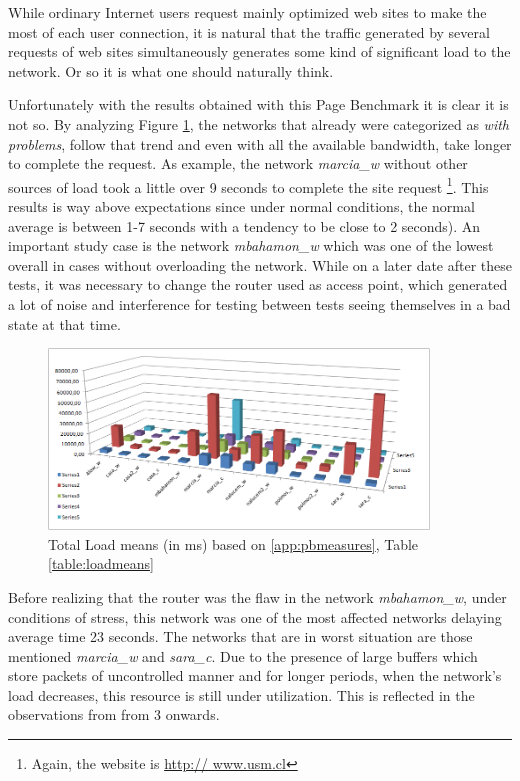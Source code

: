 While ordinary Internet users request mainly optimized  web sites to make the
most of each user connection, it is natural that the traffic generated by
several requests of web sites simultaneously generates some kind of significant
load to the network. Or so it is what one should naturally think.

Unfortunately with the results obtained with this Page Benchmark it is 
clear it is not so. By analyzing Figure \ref{fig:loadmeans}, the
networks that already were categorized as \emph{with problems}, follow that
trend and even with all the available bandwidth, take longer to complete the
request. As example, the network \emph{marcia\_w} without other sources of
load took a little over 9 seconds to complete the site request \footnote
{Again, the website is \url{http:// www.usm.cl}}. This results is way above
expectations since under normal conditions, the normal average is between 1-7
seconds with a tendency to be close to 2 seconds). An important study case is the network \emph{mbahamon\_w} which was one of the lowest overall
in cases without overloading the network. While on a later date after these
tests, it was necessary to change the router used as access point, which
generated a lot of noise and interference for testing between tests seeing
themselves in a bad state at that time.

\begin{figure}[ht]
\centering
    \includegraphics[width=0.9\textwidth]{img/measures_page}
\caption[Page Benchmark: Total Load Means]{ Total Load means (in ms) based on \ref{app:pbmeasures}, Table \ref{table:loadmeans}}
\label{fig:loadmeans}
\end{figure}%

Before realizing that the router was the flaw in the network
\emph{mbahamon\_w}, under conditions of stress, this network was one of the
most affected networks delaying average time 23 seconds. The networks that are
in worst situation are those mentioned \emph{marcia\_w} and
\emph{sara\_c}. Due to the presence of large buffers which store packets of
uncontrolled manner and for longer periods, when the network's load decreases,
this resource  is still under utilization. This is reflected in the observations
from from 3 onwards.

